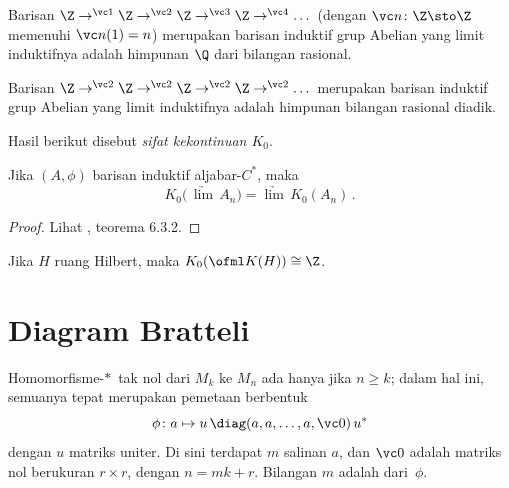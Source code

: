 \begin{exam} Barisan $\Z \to^{\vc 1} \Z \to^{\vc 2} \Z \to^{\vc 3} \Z \to^{\vc 4} \dots$
(dengan $\vc n \colon \Z \sto \Z$ memenuhi $\vc n(1) = n$) merupakan barisan induktif grup
Abelian yang limit induktifnya adalah himpunan $\Q$ dari bilangan rasional.
\end{exam}

\begin{exam} Barisan $\Z \to^{\vc 2} \Z \to^{\vc 2} \Z \to^{\vc 2} \Z \to^{\vc 2} \dots$
merupakan barisan induktif grup Abelian yang limit induktifnya adalah himpunan bilangan rasional
diadik.
\end{exam}

Hasil berikut disebut
\emph{sifat kekontinuan $K_0$}.

\begin{prop} Jika $(A,\phi)$ barisan induktif aljabar-$C^*$, maka
   \[ K_0\bigl(\,\underrightarrow{\lim}\, A_n\bigr) = \underrightarrow{\lim}\,K_0(A_n)\,. \]
\end{prop}

\begin{proof} Lihat \cite{RordamLL:2000}, teorema 6.3.2.   \ns \end{proof}

\begin{exam} Jika $H$ ruang Hilbert,
maka $K_0(\ofml K(H)) \cong \Z$.
\end{exam}





















\section{Diagram Bratteli}
\begin{prop} Homomorfisme-$*\,$ tak nol dari $M_k$ ke $M_n$ ada hanya jika $n \ge k$; dalam
hal ini, semuanya tepat merupakan pemetaan berbentuk
   \[ \phi\colon a \mapsto u\,\diag(a, a, \dots, a, \vc 0)\, u^* \] %
dengan $u$ matriks uniter. Di sini terdapat $m$ salinan $a$, dan $\vc 0$ adalah matriks nol berukuran $r \times
r$, dengan $n = mk + r$. Bilangan $m$ adalah
 dari~$\phi$.
\end{prop}

